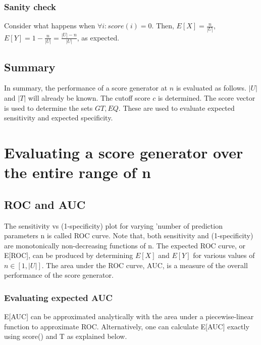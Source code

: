 \documentclass{article}
\begin{document}
\subsubsection{Sanity check}
Consider what happens when $\forall i: score(i) = 0$. Then, $E[X] = \frac{n}{|U|}$, $E[Y] = 1 - \frac{n}{|U|} = \frac{|U| - n}{|U|}$, as expected.

\subsection{Summary}
In summary, the performance of a score generator at $n$ is evaluated as follows. $|U|$ and $|T|$ will already be known. The cutoff score $c$ is determined. The score vector is used to determine the sets $GT, EQ$. These are used to evaluate expected sensitivity and expected specificity.

\section{Evaluating a score generator over the entire range of n}
\subsection{ROC and AUC}
The sensitivity vs (1-specificity) plot for varying 'number of prediction parameters n is called ROC curve. Note that, both sensitivity and (1-specificity) are monotonically non-decreasing functions of n. The expected ROC curve, or E[ROC], can be produced by determining $E[X]$ and $E[Y]$ for various values of $n \in [1, |U|]$. The area under the ROC curve, AUC, is a measure of the overall performance of the score generator.

\subsubsection{Evaluating expected AUC}
E[AUC] can be approximated analytically with the area under a piecewise-linear function to approximate ROC. Alternatively, one can calculate E[AUC] exactly using score() and T as explained below.
\end{document}
